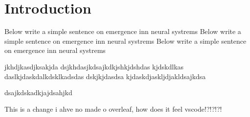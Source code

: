 \documentclass[]{article}
\begin{document}
\section{Introduction}
Below write a simple sentence on emergence inn neural systrems
Below write a simple sentence on emergence inn neural systrems
Below write a simple sentence on emergence inn neural systrems

jkhdjkasdjksakjda
dsjkhdasjkdsajkdkjshkjdshdas
kjdskdlkas
daslkjdaskdalkdsklkadsdas
dskjkjdasdsa
kjdaskdjaskljdjakldsajkdsa

dsajkdskadkjajdsahjkd

This is a change i ahve no made o overleaf, how does it feel vscode!?!?!?!
\end{document}
